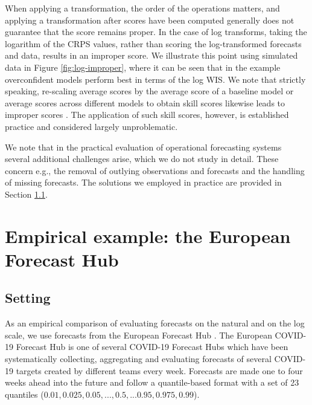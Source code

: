 \documentclass{article}
\begin{document}
When applying a transformation, the order of the operations matters, and applying a transformation after scores have been computed generally does not guarantee that the score remains proper. In the case of log transforms, taking the logarithm of the CRPS values, rather than scoring the log-transformed forecasts and data, results in an improper score. We illustrate this point using simulated data in Figure \ref{fig:log-improper}, where it can be seen that in the example overconfident models perform best in terms of the log WIS. We note that strictly speaking, re-scaling average scores by the average score of a baseline model or average scores across different models  to obtain skill scores likewise leads to improper scores \citep{gneitingStrictlyProperScoring2007}. The application of such skill scores, however, is established practice and considered largely unproblematic.

We note that in the practical evaluation of operational forecasting systems  several additional challenges arise, which we do not study in detail. These concern e.g., the removal of outlying observations and forecasts and the handling of missing forecasts. The solutions we employed in practice are provided in Section \ref{sec:HUB-setting}.



\section{Empirical example: the European Forecast Hub}
\label{sec:HUB}

\subsection{Setting}
\label{sec:HUB-setting}

As an empirical comparison of evaluating forecasts on the natural and on the log scale, we use forecasts from the European Forecast Hub \citep{europeancovid-19forecasthubEuropeanCovid19Forecast2021, sherrattPredictivePerformanceMultimodel2022}. 
The European COVID-19 Forecast Hub is one of several COVID-19 Forecast Hubs \citep{cramerEvaluationIndividualEnsemble2021, bracherShorttermForecastingCOVID192021} which have been systematically collecting, aggregating and evaluating forecasts of several COVID-19 targets created by different teams every week. Forecasts are made one to four weeks ahead into the future and follow a quantile-based format with a set of 23 quantiles ($0.01, 0.025, 0.05, ..., 0.5, ... 0.95, 0.975, 0.99$). 
\end{document}
